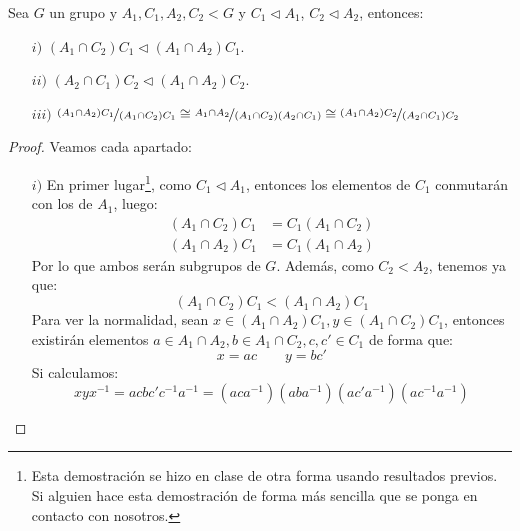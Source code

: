 \begin{teo}\label{teo:4_isomorfia}
    Sea $G$ un grupo y $A_1,C_1,A_2,C_2 < G$ y $C_1\lhd A_1$, $C_2 \lhd A_2$, entonces:
    \begin{enumerate}
        \item[$i)$] $(A_1\cap C_2) C_1 \lhd (A_1 \cap A_2)C_1$.
        \item[$ii)$] $(A_2 \cap C_1) C_2 \lhd (A_1\cap A_2)C_2$.
        \item[$iii)$] $\nicefrac{(A_1\cap A_2)C_1}{(A_1\cap C_2)C_1} \cong \nicefrac{A_1\cap A_2}{(A_1\cap C_2)(A_2\cap C_1)}\cong \nicefrac{(A_1\cap A_2)C_2}{(A_2\cap C_1)C_2} $
    \end{enumerate}

    \begin{proof} Veamos cada apartado:
        \begin{enumerate} %
            \item[$i)$] En primer lugar\footnote{Esta demostración se hizo en clase de otra forma usando resultados previos. Si alguien hace esta demostración de forma más sencilla que se ponga en contacto con nosotros.}, como $C_1\lhd A_1$, entonces los elementos de $C_1$ conmutarán con los de $A_1$, luego:
                \begin{align*}
                    (A_1\cap C_2)C_1 &= C_1(A_1\cap C_2) \\
                    (A_1\cap A_2)C_1 &= C_1(A_1\cap A_2)
                \end{align*}
                Por lo que ambos serán subgrupos de $G$. Además, como $C_2 < A_2$, tenemos ya que:
                \begin{equation*}
                    (A_1\cap C_2) C_1 < (A_1\cap A_2) C_1
                \end{equation*}
                Para ver la normalidad, sean $x\in (A_1\cap A_2)C_1, y\in (A_1\cap C_2)C_1$, entonces existirán elementos $a\in A_1\cap A_2, b\in A_1\cap C_2, c,c' \in C_1$ de forma que:
                \begin{equation*}
                    x = ac \qquad y = bc'
                \end{equation*}
                Si calculamos:
                \begin{equation*}
                    xyx^{-1} = acbc'c^{-1}a^{-1} = (aca^{-1})(aba^{-1})(ac'a^{-1})(ac^{-1}a^{-1}) 
                \end{equation*}

\end{enumerate}
\end{proof}
\end{teo}
